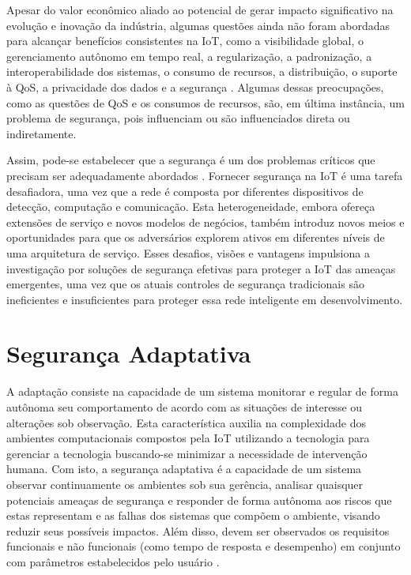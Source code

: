 \documentclass[tid,table]{texufpel} %
\newcommand {\AY} {\todo[inline, color=green]} %
\begin{document}
Apesar do valor econômico aliado ao potencial de gerar impacto significativo na evolução e inovação da indústria, algumas questões ainda não foram abordadas para alcançar benefícios consistentes na IoT, como a visibilidade global, o gerenciamento autônomo em tempo real, a regularização, a padronização, a interoperabilidade dos sistemas, o consumo de recursos, a distribuição, o suporte à QoS, a privacidade dos dados e a segurança \cite{weber10, miorandi12}. Algumas dessas preocupações, como as questões de QoS e os consumos de recursos, são, em última instância, um problema de segurança, pois influenciam ou são influenciados direta ou indiretamente. 

Assim, pode-se estabelecer que a segurança é um dos problemas críticos que precisam ser adequadamente abordados \cite{miorandi12, roman13, sicari15}. Fornecer segurança na IoT é uma tarefa desafiadora, uma vez que a rede é composta por diferentes dispositivos de detecção, computação e comunicação. Esta heterogeneidade, embora ofereça extensões de serviço e novos modelos de negócios, também introduz novos meios e oportunidades para que os adversários explorem ativos em diferentes níveis de uma arquitetura de serviço. Esses desafios, visões e vantagens impulsiona a investigação por soluções de segurança efetivas para proteger a IoT das ameaças emergentes, uma vez que os atuais controles de segurança tradicionais são ineficientes e insuficientes para proteger essa rede inteligente em desenvolvimento.

\section{Segurança Adaptativa}

A adaptação
 consiste na capacidade de um sistema monitorar 
 e regular de forma autônoma seu comportamento de acordo com as situações de interesse ou alterações sob observação. Esta característica auxilia na complexidade dos ambientes computacionais compostos pela IoT utilizando a tecnologia para gerenciar a tecnologia buscando-se minimizar a necessidade de intervenção humana. Com isto, a segurança adaptativa é a capacidade de um sistema observar continuamente os ambientes sob sua gerência, analisar quaisquer potenciais ameaças de segurança e responder de forma autônoma aos riscos que estas representam e as falhas dos sistemas que compõem o ambiente, visando reduzir seus possíveis impactos. Além disso, devem ser observados os requisitos funcionais e não funcionais (como tempo de resposta e desempenho) em conjunto com parâmetros estabelecidos pelo usuário \cite{aman15}.
\end{document}
